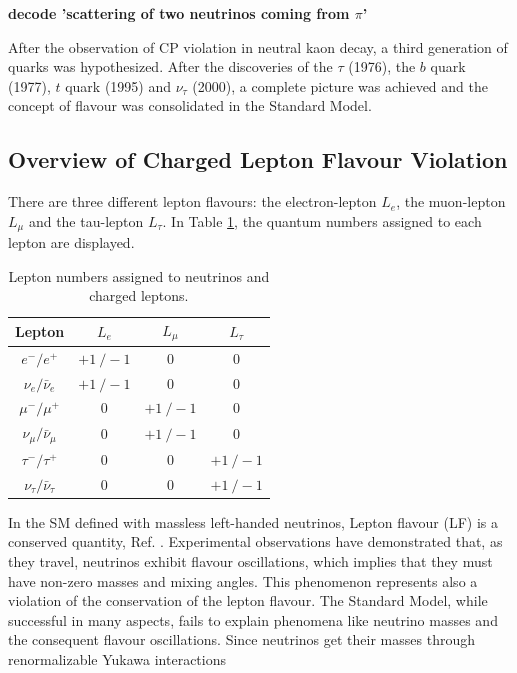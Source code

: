 {\bf \violet decode 'scattering of two neutrinos coming from $\pi$' }

After the observation of CP violation in neutral kaon decay, a third generation of quarks was hypothesized. After the discoveries of the $\tau$ (1976), 
the $b$ quark (1977), $t$ quark (1995) and $\nu_{\tau}$ (2000), a complete picture was achieved and the concept of flavour was consolidated in the Standard Model.


\subsection{Overview of Charged Lepton Flavour Violation}


There are three different lepton flavours: the electron-lepton $L_e$, the muon-lepton $L_{\mu}$ and the tau-lepton $L_{\tau}$. In Table \ref{tab:leptons}, the quantum numbers assigned to each lepton are displayed.
 \begin{center}  
\begin{table}[!h]
\centering
\renewcommand{\arraystretch}{1.5}
\begin{tabular}{c c c c}
\hline
Lepton & $L_e$ & $L_{\mu}$ & $L_{\tau}$\\
\hline
$e^-/e^+$ & $+1 \ /-1$ & 0 & 0 \\
$\nu_{e}/\bar{\nu}_{e}$ & $+1 \ /-1$ & 0 & 0 \\
$\mu^-/\mu^+$ & 0 & $+1 \ /-1$ & 0 \\
$\nu_{\mu}/\bar{\nu}_{\mu}$ & 0 & $+1 \ /-1$ & 0 \\
$\tau^-/\tau^+$ & 0 & 0 & $+1 \ /-1$\\
$\nu_{\tau}/\bar{\nu}_{\tau}$ & 0 & 0 & $+1 \ /-1$ \\
\hline
\end{tabular}
\caption{Lepton numbers assigned to neutrinos and charged leptons.}
\label{tab:leptons}
\end{table}
\end{center}
In the  SM defined with massless left-handed neutrinos, Lepton flavour (LF) is a conserved quantity, Ref. \cite{universe8060299}. Experimental observations have demonstrated that, as they travel, neutrinos exhibit flavour oscillations, which implies that they must have non-zero masses and mixing angles. This phenomenon represents also a violation of the conservation of the lepton flavour. The Standard Model, while successful in many aspects, fails to explain phenomena like neutrino masses and the consequent flavour oscillations. Since neutrinos get their masses through renormalizable Yukawa interactions
